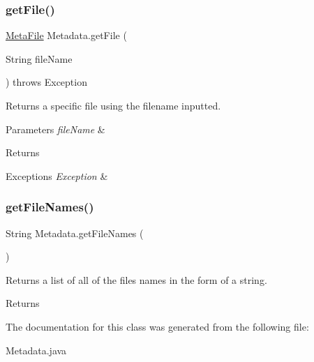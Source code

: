 \subsubsection{\texorpdfstring{get\+File()}{getFile()}}
{\footnotesize\ttfamily \mbox{\hyperlink{class_meta_file}{Meta\+File}} Metadata.\+get\+File (\begin{DoxyParamCaption}\item[{String}]{file\+Name }\end{DoxyParamCaption}) throws Exception\hspace{0.3cm}{\ttfamily [inline]}}

Returns a specific file using the filename inputted. 
\begin{DoxyParams}{Parameters}
{\em file\+Name} & \\
\hline
\end{DoxyParams}
\begin{DoxyReturn}{Returns}

\end{DoxyReturn}

\begin{DoxyExceptions}{Exceptions}
{\em Exception} & \\
\hline
\end{DoxyExceptions}
\mbox{\label{class_metadata_a47932985a21ca5fe3e99726b50c36658}} 
\subsubsection{\texorpdfstring{get\+File\+Names()}{getFileNames()}}
{\footnotesize\ttfamily String Metadata.\+get\+File\+Names (\begin{DoxyParamCaption}{ }\end{DoxyParamCaption})\hspace{0.3cm}{\ttfamily [inline]}}

Returns a list of all of the file\textquotesingle{}s names in the form of a string. \begin{DoxyReturn}{Returns}

\end{DoxyReturn}


The documentation for this class was generated from the following file\+:\begin{DoxyCompactItemize}
\item 
Metadata.\+java\end{DoxyCompactItemize}
